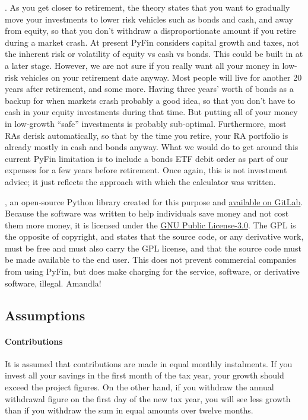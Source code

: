 \documentclass[a4paper, justified]{tufte-handout}
\begin{document}
. As you get closer to retirement, the theory states that you want to gradually move your investments to lower risk vehicles such as bonds and cash, and away from equity, so that you don't withdraw a disproportionate amount if you retire during a market crash. At present PyFin considers capital growth and taxes, not the inherent risk or volatility of equity vs cash vs bonds. This could be built in at a later stage. However, we are not sure if you really want all your money in low-risk vehicles on your retirement date anyway. Most people will live for another 20 years after retirement, and some more. Having three years' worth of bonds as a backup for when markets crash probably a good idea, so that you don't have to cash in your equity investments during that time. But putting all of your money in low-growth ``safe'' investments is probably sub-optimal. Furthermore, most RAs derisk automatically, so that by the time you retire, your RA portfolio is already mostly in cash and bonds anyway. What we would do to get around this current PyFin limitation is to include a bonds ETF debit order as part of our expenses for a few years before retirement. Once again, this is not investment advice; it just reflects the approach with which the calculator was written.

, an open-source Python library created for this purpose and \href{https://gitlab.com/invokeanalytics/pyfin}{available on GitLab}. Because the software was written to help individuals save money and not cost them more money, it is licensed under the \href{https://opensource.org/licenses/GPL-3.0}{GNU Public License-3.0}. The GPL is the opposite of copyright, and states that the source code, or any derivative work, must be free and must also carry the GPL license, and that the source code must be made available to the end user. This does not prevent commercial companies from using PyFin, but does make charging for the service, software, or derivative software, illegal. Amandla!

\subsection{Assumptions}

\paragraph{Contributions} It is assumed that contributions are made in equal monthly instalments. If you invest all your savings in the first month of the tax year, your growth should exceed the project figures. On the other hand, if you withdraw the annual withdrawal figure on the first day of the new tax year, you will see less growth than if you withdraw the sum in equal amounts over twelve months.
\end{document}
